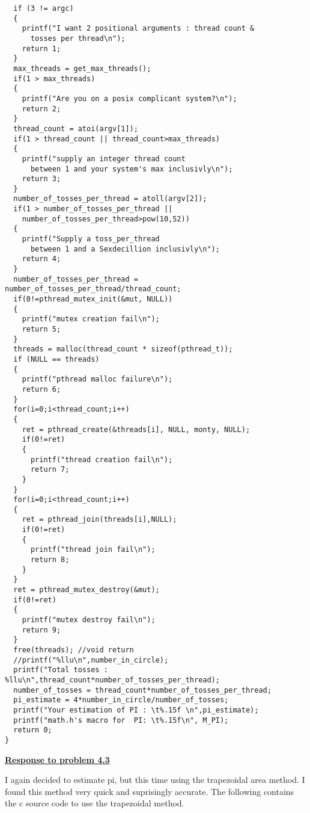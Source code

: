 \documentclass{article}
\begin{document}
\begin{lstlisting}
  if (3 != argc)
  {
    printf("I want 2 positional arguments : thread count &
	  tosses per thread\n");
    return 1;
  }
  max_threads = get_max_threads();
  if(1 > max_threads)
  {
    printf("Are you on a posix complicant system?\n");
    return 2;
  }
  thread_count = atoi(argv[1]);
  if(1 > thread_count || thread_count>max_threads)
  {
    printf("supply an integer thread count 
      between 1 and your system's max inclusivly\n");
    return 3;
  }
  number_of_tosses_per_thread = atoll(argv[2]);
  if(1 > number_of_tosses_per_thread || 
    number_of_tosses_per_thread>pow(10,52))
  {
    printf("Supply a toss_per_thread
      between 1 and a Sexdecillion inclusivly\n");
    return 4;
  }
  number_of_tosses_per_thread = number_of_tosses_per_thread/thread_count;
  if(0!=pthread_mutex_init(&mut, NULL))
  {
    printf("mutex creation fail\n");
    return 5;
  }
  threads = malloc(thread_count * sizeof(pthread_t));
  if (NULL == threads)
  {
    printf("pthread malloc failure\n");
    return 6;
  }
  for(i=0;i<thread_count;i++)
  {
    ret = pthread_create(&threads[i], NULL, monty, NULL);
    if(0!=ret)
    {
      printf("thread creation fail\n");
      return 7;
    }
  }
  for(i=0;i<thread_count;i++)
  {
    ret = pthread_join(threads[i],NULL);
    if(0!=ret)
    {
      printf("thread join fail\n");
      return 8;
    }
  }
  ret = pthread_mutex_destroy(&mut);  
  if(0!=ret)
  {
    printf("mutex destroy fail\n");
    return 9;
  }
  free(threads); //void return
  //printf("%llu\n",number_in_circle);
  printf("Total tosses : %llu\n",thread_count*number_of_tosses_per_thread);
  number_of_tosses = thread_count*number_of_tosses_per_thread;
  pi_estimate = 4*number_in_circle/number_of_tosses;
  printf("Your estimation of PI : \t%.15f \n",pi_estimate);
  printf("math.h's macro for  PI: \t%.15f\n", M_PI);
  return 0;
}

\end{lstlisting}

\bigskip

\noindent \textbf{\underline{Response to problem 4.3}}

I again decided to estimate pi, but this time using the trapezoidal area method.
I found this method very quick and suprisingly accurate. The following contains the c source
code to use the trapezoidal method. 
\end{document}
